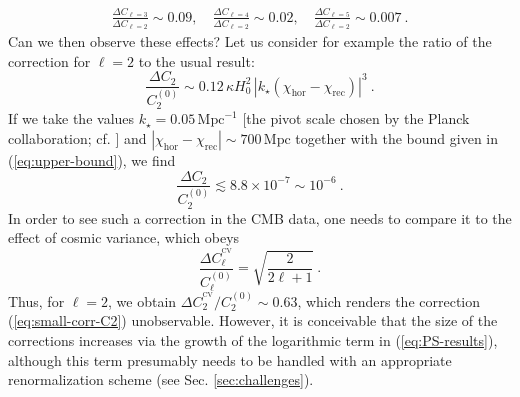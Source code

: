 \documentclass[12pt]{iopart}
\def\eq#1{\begin{equation}\begin{aligned}#1\end{aligned}\end{equation}}
\def\eref#1{(\ref{eq:#1})}
\begin{document}
\eq{
\frac{\Delta C_{\ell=3}}{\Delta C_{\ell=2}}\sim 0.09,\quad\frac{\Delta C_{\ell=4}}{\Delta C_{\ell=2}}\sim 0.02,
\quad\frac{\Delta C_{\ell=5}}{\Delta C_{\ell=2}}\sim 0.007 \ .
}
Can we then observe these effects? Let us consider for example the ratio of the correction for $\ell = 2$ to the usual result:
\begin{equation}
\frac{\Delta C_2}{C_2^{(0)}} \sim 0.12\,\kappa H_0^2\,|k_{\star}(\chi_\text{hor}-\chi_{\text{rec}})|^3\ .
\end{equation}
If we take the values $k_{\star} =0.05\,\text{Mpc}^{-1}$ [the pivot scale chosen by the Planck collaboration; cf. \citet{Planck2016}] and $|\chi_\text{hor}-\chi_{\text{rec}}| \sim 700\,\text{Mpc}$ \citep{Ashtekar:2016wpi} together with the bound given in \eref{upper-bound}, we find
\begin{equation}\label{eq:small-corr-C2}
\frac{\Delta C_2}{C_2^{(0)}} \lesssim 8.8\times 10^{-7} \sim 10^{-6} \ .
\end{equation}
In order to see such a correction in the CMB data, one needs to compare it to the effect of cosmic variance, which obeys
\begin{equation}
\frac{\Delta C_\ell^{^\text{CV}}}{C_\ell^{(0)}} =\sqrt{\frac{2}{2\ell +1}} \ .
\end{equation}
Thus, for $\ell = 2$, we obtain $\Delta C_2^{^\text{CV}}/C_2^{(0)} \sim 0.63$, which renders the correction \eref{small-corr-C2} unobservable. However, it is conceivable that the size of the corrections increases via the growth of the logarithmic term in \eref{PS-results}, although this term presumably needs to be handled with an appropriate renormalization scheme (see Sec. \ref{sec:challenges}).
\end{document}

